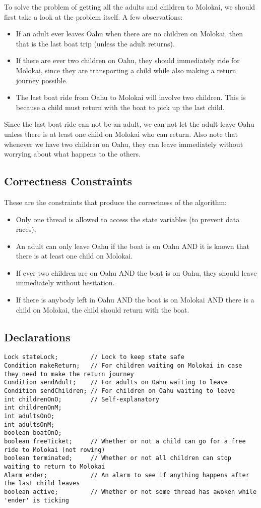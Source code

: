 \documentclass{article}
\begin{document}
To solve the problem of getting all the adults and children to Molokai, we should first take a look at the problem itself. A few observations:
\begin{itemize}
  \item If an adult ever leaves Oahu when there are no children on Molokai, then that is the last boat trip (unless the adult returns).
  \item If there are ever two children on Oahu, they should immediately ride for Molokai, since they are transporting a child while also making a return journey possible.
  \item The last boat ride from Oahu to Molokai will involve two children. This is because a child must return with the boat to pick up the last child.
\end{itemize}
Since the last boat ride can not be an adult, we can not let the adult leave Oahu unless there is at least one child on Molokai who can return. Also note that whenever we have two children on Oahu, they can leave immediately without worrying about what happens to the others.

\subsection{Correctness Constraints}

These are the constraints that produce the correctness of the algorithm:
\begin{itemize}
  \item Only one thread is allowed to access the state variables (to prevent data races).
  \item An adult can only leave Oahu if the boat is on Oahu AND it is known that there is at least one child on Molokai.
  \item If ever two children are on Oahu AND the boat is on Oahu, they should leave immediately without hesitation.
  \item If there is anybody left in Oahu AND the boat is on Molokai AND there is a child on Molokai, the child should return with the boat.
\end{itemize}

\subsection{Declarations}
\scriptsize
\begin{lstlisting}
Lock stateLock;         // Lock to keep state safe
Condition makeReturn;   // For children waiting on Molokai in case they need to make the return journey
Condition sendAdult;    // For adults on Oahu waiting to leave
Condition sendChildren; // For children on Oahu waiting to leave
int childrenOnO;        // Self-explanatory
int childrenOnM;
int adultsOnO;
int adultsOnM;
boolean boatOnO;
boolean freeTicket;     // Whether or not a child can go for a free ride to Molokai (not rowing)
boolean terminated;     // Whether or not all children can stop waiting to return to Molokai
Alarm ender;            // An alarm to see if anything happens after the last child leaves
boolean active;         // Whether or not some thread has awoken while 'ender' is ticking
\end{lstlisting}
\normalsize
\end{document}
